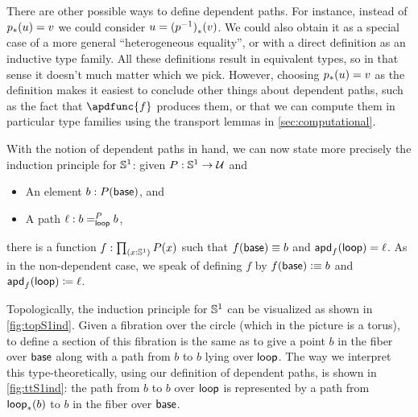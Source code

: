 \begin{rmk}
There are other possible ways to define dependent paths.
For instance, instead of $\trans p u = v$ we could consider $u = \trans{(\opp p)}{v}$.
We could also obtain it as a special case of a more general ``heterogeneous equality'', or with a direct definition as an inductive type family.
All these definitions result in equivalent types, so in that sense it doesn't much matter which we pick.
However, choosing $\trans p u = v$ as the definition makes it easiest to conclude other things about dependent paths, such as the fact that $\apdfunc{f}$ produces them, or that we can compute them in particular type families using the transport lemmas in \autoref{sec:computational}.
\end{rmk}

With the notion of dependent paths in hand, we can now state more precisely the induction principle for $\Sn^1$: given $P:\Sn^1\to\type$ and
\begin{itemize}
\item An element $b:P(\base)$, and
\item A path $\ell : \dpath P \lloop b b$,
\end{itemize}
there is a function $f:\prd{x:\Sn^1} P(x)$ such that $f(\base)\jdeq b$ and $\apd f \lloop = \ell$.
As in the non-dependent case, we speak of defining $f$ by $f(\base)\defeq b$ and $\apd f \lloop \defid \ell$.

Topologically, the induction principle for $\Sn^1$ can be visualized as shown in \autoref{fig:topS1ind}.
Given a fibration over the circle (which in the picture is a torus), to define a section of this fibration is the same as to give a point $b$ in the fiber over $\base$ along with a path from $b$ to $b$ lying over $\lloop$.
The way we interpret this type-theoretically, using our definition of dependent paths, is shown in \autoref{fig:ttS1ind}: the path from $b$ to $b$ over $\lloop$ is represented by a path from $\trans \lloop b$ to $b$ in the fiber over $\base$.

